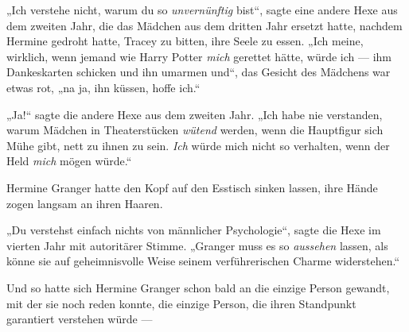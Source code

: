 „Ich verstehe nicht, warum du so \emph{unvernünftig} bist“, sagte eine andere Hexe aus dem zweiten Jahr, die das Mädchen aus dem dritten Jahr ersetzt hatte, nachdem Hermine gedroht hatte, Tracey zu bitten, ihre Seele zu essen.
„Ich meine, wirklich, wenn jemand wie Harry Potter \emph{mich} gerettet hätte, würde ich — ihm Dankeskarten schicken und ihn umarmen und“, das Gesicht des Mädchens war etwas rot, „na ja, ihn küssen, hoffe ich.“

„Ja!“ sagte die andere Hexe aus dem zweiten Jahr.
„Ich habe nie verstanden, warum Mädchen in Theaterstücken \emph{wütend} werden, wenn die Hauptfigur sich Mühe gibt, nett zu ihnen zu sein. \emph{Ich} würde mich nicht so verhalten, wenn der Held \emph{mich} mögen würde.“

Hermine Granger hatte den Kopf auf den Esstisch sinken lassen, ihre Hände zogen langsam an ihren Haaren.

„Du verstehst einfach nichts von männlicher Psychologie“, sagte die Hexe im vierten Jahr mit autoritärer Stimme.
„Granger muss es so \emph{aussehen} lassen, als könne sie auf geheimnisvolle Weise seinem verführerischen Charme widerstehen.“


Und so hatte sich Hermine Granger schon bald an die einzige Person gewandt, mit der sie noch reden konnte, die einzige Person, die ihren Standpunkt garantiert verstehen würde —

